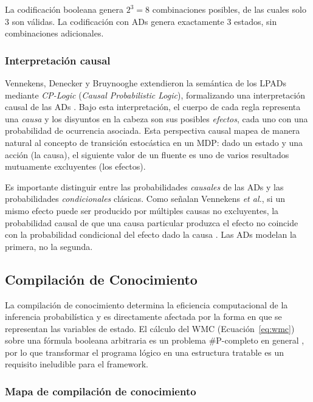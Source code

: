 La codificación booleana genera $2^3 = 8$ combinaciones posibles, de las cuales solo 3 son válidas. La codificación con ADs genera exactamente 3 estados, sin combinaciones adicionales.

\subsubsection{Interpretación causal}

Vennekens, Denecker y Bruynooghe extendieron la semántica de los LPADs mediante \textit{CP-Logic} (\textit{Causal Probabilistic Logic}), formalizando una interpretación causal de las ADs \cite{vennekens2009cplogic}. Bajo esta interpretación, el cuerpo de cada regla representa una \textit{causa} y los disyuntos en la cabeza son sus posibles \textit{efectos}, cada uno con una probabilidad de ocurrencia asociada. Esta perspectiva causal mapea de manera natural al concepto de transición estocástica en un MDP: dado un estado y una acción (la causa), el siguiente valor de un fluente es uno de varios resultados mutuamente excluyentes (los efectos).

Es importante distinguir entre las probabilidades \textit{causales} de las ADs y las probabilidades \textit{condicionales} clásicas. Como señalan Vennekens \textit{et al.}, si un mismo efecto puede ser producido por múltiples causas no excluyentes, la probabilidad causal de que una causa particular produzca el efecto no coincide con la probabilidad condicional del efecto dado la causa \cite{vennekens2004lpads}. Las ADs modelan la primera, no la segunda.


\subsection{Compilación de Conocimiento}
\label{sec:mt-compilacion}

La compilación de conocimiento determina la eficiencia computacional de la inferencia probabilística y es directamente afectada por la forma en que se representan las variables de estado. El cálculo del WMC (Ecuación~\ref{eq:wmc}) sobre una fórmula booleana arbitraria es un problema \#P-completo en general \cite{darwiche2002knowledge}, por lo que transformar el programa lógico en una estructura tratable es un requisito ineludible para el framework.

\subsubsection{Mapa de compilación de conocimiento}

